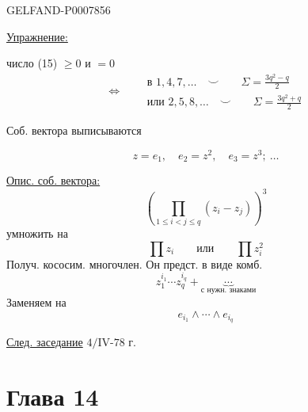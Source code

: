 \begin{GelfandAdjacentEvidence}{GELFAND-P000785}{6}


\underline{Упражнение:}

число (15) \(\geq0\) и \(=0\)
\[
\Longleftrightarrow\quad
\begin{aligned}
&\text{в }1,4,7,\ldots\quad\smile\qquad
\Sigma=\frac{3q^2-q}{2}\\
&\text{или }2,5,8,\ldots\quad\smile\qquad
\Sigma=\frac{3q^2+q}{2}
\end{aligned}
\]
\end{GelfandAdjacentEvidence}


Соб. вектора выписываются

\[
z=e_1,\quad e_2=z^2,\quad e_3=z^3;\ \ldots
\]

\underline{Опис. соб. вектора:}
\[
\left(\prod_{1\leq i<j\leq q}(z_i-z_j)\right)^3
\]
умножить на
\[
\prod z_i\qquad\text{или}\qquad\prod z_i^2
\]
Получ. кососим. многочлен. Он предст. в виде комб.
\[
z_1^{i_1}\cdots z_q^{i_q}+\underbrace{\cdots}_{\text{с нужн. знаками}}
\]
Заменяем на
\[
e_{i_1}\wedge\cdots\wedge e_{i_q}
\]

\underline{След. заседание} \(4/\mathrm{IV}\text{-}78\) г.


\clearpage{}
\section*{Глава 14}


